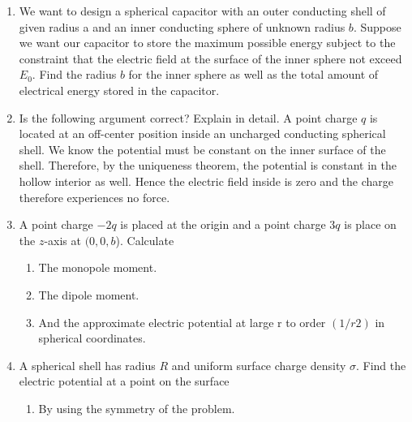 \documentclass[fleqn]{article}
\begin{document}
\begin{enumerate}
    \item We want to design a spherical capacitor with an outer conducting shell of given radius a and an inner conducting sphere of 
    unknown radius $b$. Suppose we want our capacitor to store the maximum possible energy subject to the constraint that the electric 
    field at the surface of the inner sphere not exceed $E_0$. Find the radius $b$ for the inner sphere as well as the total amount of 
    electrical energy stored in the capacitor.




    \item Is the following argument correct? Explain in detail. A point charge $q$ is located at an off-center position inside an 
    uncharged conducting spherical shell. We know the potential must be constant on the inner surface of the shell. Therefore, by the 
    uniqueness theorem, the potential is constant in the hollow interior as well. Hence the electric field inside is zero and the 
    charge therefore experiences no force.




    \item A point charge $−2q$ is placed at the origin and a point charge $3q$ is
    place on the $z$-axis at $(0, 0, b$). Calculate
    \begin{enumerate}
      \item The monopole moment.
 



      \item The dipole moment.




      \item And the approximate electric potential at large r to order $(1/r2)$
      in spherical coordinates.


      
    \end{enumerate}


    \item A spherical shell has radius $R$ and uniform surface charge density $\sigma$. Find the electric potential 
    at a point on the surface
    \begin{enumerate}
      \item By using the symmetry of the problem.


\end{enumerate}
\end{enumerate}
\end{document}
